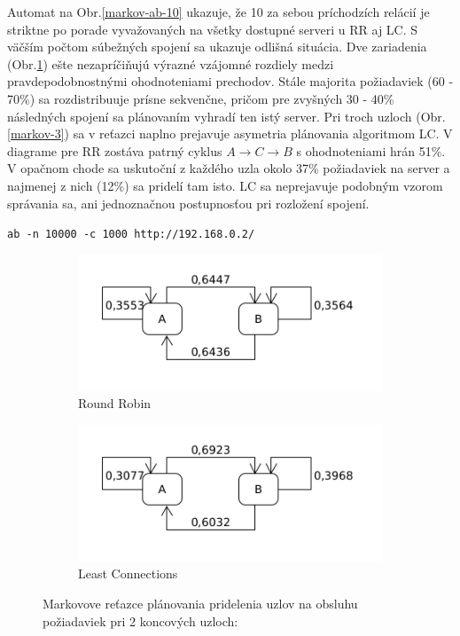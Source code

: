 \documentclass[12pt, a4paper]{article}
\begin{document}
Automat na Obr.\ref{markov-ab-10} ukazuje, že 10 za sebou príchodzích relácií je striktne po porade 
vyvažovaných na všetky dostupné serveri u RR aj LC. S väčším počtom súbežných spojení sa ukazuje odlišná 
situácia. Dve zariadenia (Obr.\ref{markov-2}) ešte nezapríčiňujú výrazné vzájomné rozdiely medzi pravdepodobnostnými ohodnoteniami
prechodov. Stále majorita požiadaviek (60 - 70\%) sa rozdistribuuje prísne sekvenčne, pričom
pre zvyšných 30 - 40\% následných spojení sa plánovaním vyhradí ten istý server. Pri troch uzloch 
(Obr.\ref{markov-3})
sa v reťazci naplno prejavuje asymetria plánovania algoritmom LC. V diagrame pre RR zostáva patrný
cyklus $A \rightarrow C \rightarrow B$ s ohodnoteniami hrán 51\%. V opačnom chode sa uskutoční z každého
uzla okolo 37\% požiadaviek na server a najmenej z nich (12\%) sa pridelí tam isto. LC sa neprejavuje
podobným vzorom správania sa, ani jednoznačnou postupnosťou pri rozložení spojení.

\begin{lrbox}{\shield}
\verb|ab -n 10000 -c 1000 http://192.168.0.2/|
\end{lrbox}
\begin{figure}[h!]
	\centering
	\begin{subfigure}[t]{.48\textwidth}
  		\centering
  		\includegraphics[width=\textwidth]{images/10000-2-RR.png}
  		\caption{Round Robin}
	\end{subfigure}
	\begin{subfigure}[t]{.48\textwidth}
  		\centering
  		\includegraphics[width=\textwidth]{images/10000-2-LC.png}
  		\caption{Least Connections}
	\end{subfigure}
	\caption{Markovove reťazce plánovania pridelenia uzlov na obsluhu požiadaviek
	pri 2 koncových uzloch: \usebox{\shield}
	}
	\label{markov-2}
\end{figure}
\end{document}
